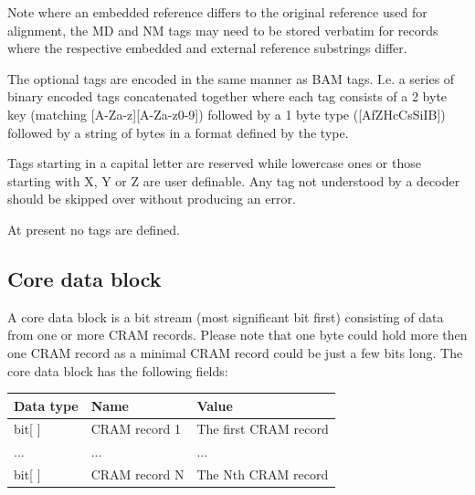 \documentclass[a4paper]{article}
\begin{document}
Note where an embedded reference differs to the original reference
used for alignment, the MD and NM tags may need to be stored verbatim
for records where the respective embedded and external reference
substrings differ.

The optional tags are encoded in the same manner as BAM tags.  I.e. a
series of binary encoded tags concatenated together where each tag
consists of a 2 byte key (matching [A-Za-z][A-Za-z0-9]) followed by a
1 byte type ([AfZHcCsSiIB]) followed by a string of bytes in a format
defined by the type.

Tags starting in a capital letter are reserved while lowercase ones or
those starting with X, Y or Z are user definable.  Any tag not
understood by a decoder should be skipped over without producing an
error.

At present no tags are defined.

%
% 


\subsection{\textbf{Core data block}}

A core data block is a bit stream (most significant bit first) consisting of data from one 
or more CRAM records. Please note that one byte could hold more then one CRAM record 
as a minimal CRAM record could be just a few bits long. The core data block has 
the following fields:

\begin{tabular}{|l|>{\raggedright}p{120pt}|>{\raggedright}p{260pt}|}
\hline
\textbf{Data type} & \textbf{Name} & \textbf{Value}
\tabularnewline
\hline
bit[ ] & CRAM record 1 & The first CRAM record\tabularnewline
\hline
... & ... & ...\tabularnewline
\hline
bit[ ] & CRAM record N & The Nth CRAM record \tabularnewline
\hline
\end{tabular}
\end{document}
